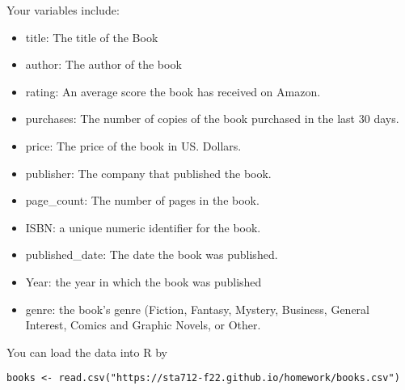 \documentclass[11pt]{article}
\begin{document}
Your variables include:
\begin{itemize}
\item title: The title of the Book
\item author: The author of the book
\item rating: An average score the book has received on Amazon.
\item purchases: The number of copies of the book purchased in the last 30 days.
\item price: The price of the book in US. Dollars.
\item publisher: The company that published the book.
\item page\_count: The number of pages in the book.
\item ISBN: a unique numeric identifier for the book.
\item published\_date: The date the book was published.
\item Year: the year in which the book was published
\item genre: the book's genre (Fiction, Fantasy, Mystery, Business, General Interest, Comics and Graphic Novels, or Other.
\end{itemize}

\noindent You can load the data into R by
\begin{verbatim}
books <- read.csv("https://sta712-f22.github.io/homework/books.csv")
\end{verbatim}
\end{document}
